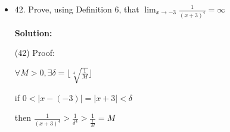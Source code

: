 \documentclass{article}
\newenvironment{solution}{
    \par \textbf{Solution: } \quad \par
}{\par}
\begin{document}
\begin{itemize}
\begin{solution}
            $\exists \epsilon = \frac{1}{2}, \forall \delta > 0$

            if $ 0 < |x| < \delta$, because of the denseness of real number, $\exists x_1 \in Q, x_2 \notin Q$

            but $|f(x_1) - f(x_2)| = 1 > \epsilon$

            so $f(x)$ doesn't have a limit when $x$ approach $0$.

        \end{solution}
        
        \item 42. Prove, using Definition 6, that $\lim_{x\to -3} \frac{1}{(x + 3) ^ 4} = \infty$
        \begin{solution}
            (42) Proof:

            $\forall M > 0, \exists \delta = \lfloor \sqrt[4]{\frac{1}{M}} \rfloor$

            if $0 < |x - (-3)| = |x + 3| < \delta$

            then $\frac{1}{(x + 3) ^ 4} > \frac{1}{\delta ^ 4} > \frac{1}{\frac{1}{M}} = M$

            

        \end{solution}
    \end{itemize}
\end{document}
